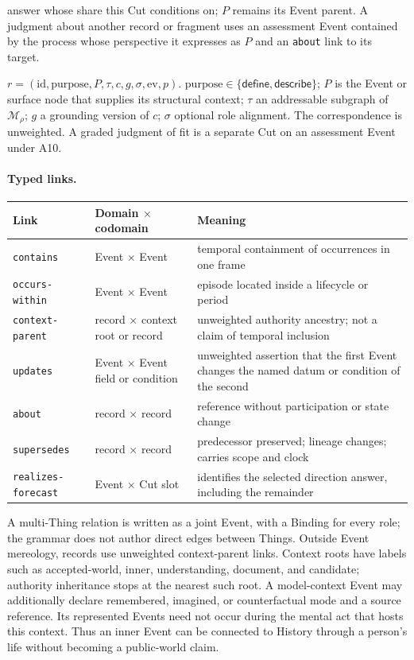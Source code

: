 \documentclass[11pt,a4paper]{article}
\begin{document}
\begin{description}[style=nextline]
    answer whose share this Cut conditions on; $P$ remains its Event parent.
    A judgment about another
    record or fragment uses an assessment Event contained by the process whose
    perspective it expresses as $P$ and an \texttt{about} link to its target.
  \item[Realization] $r=(\mathrm{id},\mathrm{purpose},P,\tau,c,g,\sigma,
    \mathrm{ev},p)$. $\mathrm{purpose}\in\{\textsf{define},\textsf{describe}\}$;
    $P$ is the Event or surface node that supplies its structural context;
    $\tau$ an addressable subgraph of $\mathcal M_\rho$; $g$ a grounding
    version of $c$; $\sigma$ optional role alignment. The
    correspondence is unweighted. A graded judgment of fit is a separate Cut
    on an assessment Event under A10.
\end{description}

\paragraph{Typed links.}
\begin{center}
\footnotesize
\begin{tabularx}{\textwidth}{@{}l l Y@{}}
\toprule
Link & Domain $\times$ codomain & Meaning \\
\midrule
\texttt{contains} & Event $\times$ Event & temporal containment of occurrences in one frame \\
\texttt{occurs-within} & Event $\times$ Event & episode located inside a lifecycle or period \\
\texttt{context-parent} & record $\times$ context root or record & unweighted authority ancestry; not a claim of temporal inclusion \\
\texttt{updates} & Event $\times$ Event field or condition & unweighted assertion that the first Event changes the named datum or condition of the second \\
\texttt{about} & record $\times$ record & reference without participation or state change \\
\texttt{supersedes} & record $\times$ record & predecessor preserved; lineage changes; carries scope and clock \\
\texttt{realizes-forecast} & Event $\times$ Cut slot & identifies the selected direction answer, including the remainder \\
\bottomrule
\end{tabularx}
\end{center}
A multi-Thing relation is written as a joint Event, with a Binding for every
role; the grammar does not author direct edges between Things. Outside Event
mereology, records use unweighted context-parent
links. Context roots have labels such as \textsf{accepted-world}, \textsf{inner},
\textsf{understanding}, \textsf{document}, and \textsf{candidate}; authority
inheritance stops at the nearest such root. A model-context Event
may additionally declare \textsf{remembered}, \textsf{imagined}, or
\textsf{counterfactual} mode and a source reference. Its represented Events
need not occur during the mental act that hosts this context. Thus an inner
Event can be connected to History through a person's life without becoming a
public-world claim.
\end{document}
